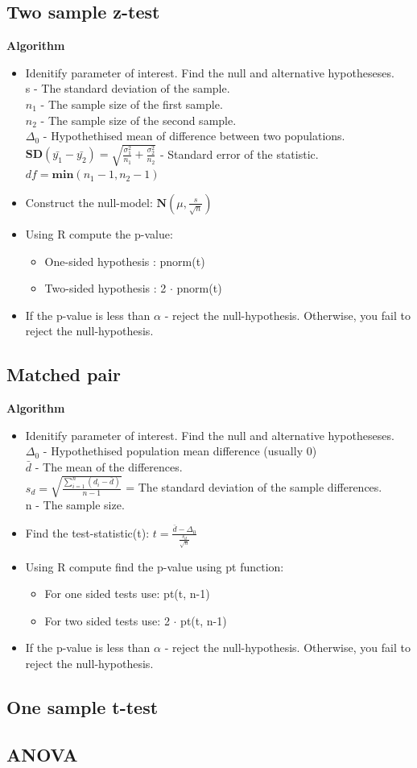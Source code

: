 \documentclass{article}
\begin{document}
\subsection{Two sample z-test}
\textbf{Algorithm}
\begin{itemize}
\item Idenitify parameter of interest. Find the null and alternative hypotheseses.\\
      s - The standard deviation of the sample.\\
      $n_1$ - The sample size of the first sample.\\
      $n_2$ - The sample size of the second sample.\\
      $\Delta_0$ - Hypothethised mean of difference between two populations.\\
      $\mathbf{SD}(\bar{y_1}-\bar{y_2}) = \sqrt{\frac{\sigma_1^2}{n_1}+\frac{\sigma_2^2}{n_2}}$ - Standard error of the statistic.\\
      $df = \mathbf{min}(n_1 - 1, n_2 -1)$
\item Construct the null-model: $\mathbf{N}(\mu,\frac{s}{\sqrt{n}})$
\item Using R compute the p-value:
\begin{itemize}
    \item One-sided hypothesis : pnorm(t)
    \item Two-sided hypothesis : 2 $\cdot$ pnorm(t)
\end{itemize}
\item If the p-value is less than $\alpha$ - reject the null-hypothesis. 
    Otherwise, you fail to reject the null-hypothesis.
\end{itemize}
\subsection{Matched pair}
\textbf{Algorithm}
\begin{itemize}
\item Idenitify parameter of interest. Find the null and alternative hypotheseses.\\
    $\Delta_0$ - Hypothethised population mean difference (usually 0)\\
    $\bar{d}$ - The mean of the differences.\\
    $s_d = \sqrt{\frac{\sum_{i = 1}^{n}(d_i - \bar{d})}{n-1}}$ = The standard deviation of the sample differences.\\
    n - The sample size.
\item Find the test-statistic(t): $t = \frac{\bar{d}-\Delta_0}{\frac{s_d}{\sqrt{n}}}$
\item Using R compute find the p-value using pt function:
\begin{itemize}
    \item For one sided tests use: pt(t, n-1)
    \item For two sided tests use: 2 $\cdot$ pt(t, n-1)
\end{itemize}
\item If the p-value is less than $\alpha$ - reject the null-hypothesis. 
    Otherwise, you fail to reject the null-hypothesis.
\end{itemize}
\subsection{One sample t-test}
\subsection{ANOVA}
\end{document}
